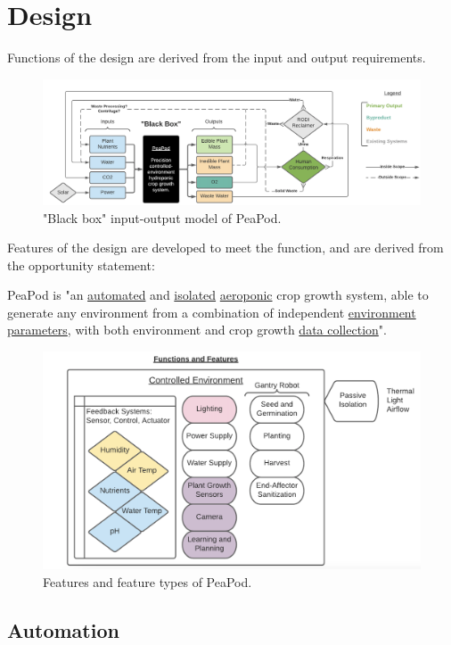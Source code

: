 \documentclass{report}
\begin{document}
\newpage

\section{Design}

Functions of the design are derived from the input and output requirements.

\begin{figure}[h]
    \centering
    \includegraphics[width=15cm]{images/blackbox.png}
    \hfill
    \caption{"Black box" input-output model of PeaPod.}
\end{figure}

Features of the design are developed to meet the function, and are derived from the opportunity statement:

PeaPod is "an \uline{automated} and \uline{isolated} \uline{aeroponic} crop growth system, able to generate any environment from a combination of independent \uline{environment parameters}, with both environment and crop growth \uline{data collection}".

\begin{figure}[h]
    \centering
    \includegraphics[width=12cm]{images/features.png}
    \hfill
    \caption{Features and feature types of PeaPod.}
\end{figure}

\newpage

\subsection{Automation}
\label{sec:automation}
\end{document}
